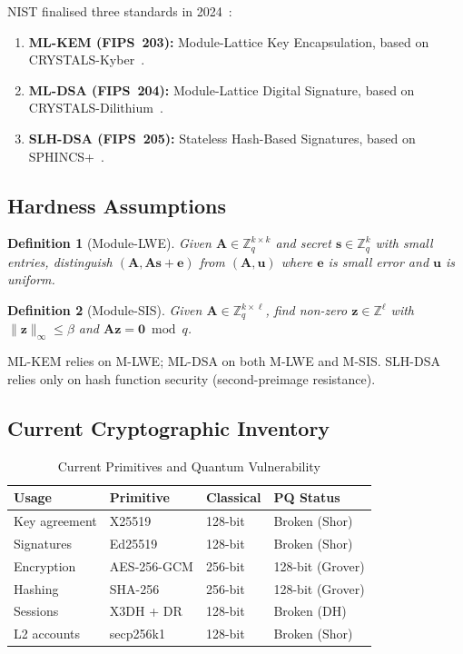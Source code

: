 \documentclass[11pt,a4paper]{article}
\newtheorem{definition}{Definition}[section]
\begin{document}
NIST finalised three standards in 2024~\cite{nist2024pqc}:

\begin{enumerate}
    \item \textbf{ML-KEM (FIPS~203):} Module-Lattice Key Encapsulation,
    based on CRYSTALS-Kyber~\cite{bos2018crystals}.
    \item \textbf{ML-DSA (FIPS~204):} Module-Lattice Digital Signature,
    based on CRYSTALS-Dilithium~\cite{ducas2018crystals}.
    \item \textbf{SLH-DSA (FIPS~205):} Stateless Hash-Based Signatures,
    based on SPHINCS+~\cite{bernstein2019sphincs}.
\end{enumerate}

\subsection{Hardness Assumptions}

\begin{definition}[Module-LWE]
    Given $\mathbf{A} \in \mathbb{Z}_q^{k \times k}$ and secret
    $\mathbf{s} \in \mathbb{Z}_q^k$ with small entries, distinguish
    $(\mathbf{A}, \mathbf{As} + \mathbf{e})$ from
    $(\mathbf{A}, \mathbf{u})$ where $\mathbf{e}$ is small error and
    $\mathbf{u}$ is uniform.
\end{definition}

\begin{definition}[Module-SIS]
    Given $\mathbf{A} \in \mathbb{Z}_q^{k \times \ell}$, find non-zero
    $\mathbf{z} \in \mathbb{Z}^{\ell}$ with
    $\|\mathbf{z}\|_\infty \leq \beta$ and
    $\mathbf{Az} = \mathbf{0} \bmod q$.
\end{definition}

ML-KEM relies on M-LWE; ML-DSA on both M-LWE and M-SIS.  SLH-DSA relies
only on hash function security (second-preimage resistance).

\subsection{Current Cryptographic Inventory}

\begin{table}[h]
\centering
\caption{Current Primitives and Quantum Vulnerability}
\label{tab:inventory}
\begin{tabular}{@{}llll@{}}
\toprule
\textbf{Usage} & \textbf{Primitive} & \textbf{Classical} & \textbf{PQ Status} \\
\midrule
Key agreement  & X25519      & 128-bit & Broken (Shor) \\
Signatures     & Ed25519     & 128-bit & Broken (Shor) \\
Encryption     & AES-256-GCM & 256-bit & 128-bit (Grover) \\
Hashing        & SHA-256     & 256-bit & 128-bit (Grover) \\
Sessions       & X3DH + DR   & 128-bit & Broken (DH) \\
L2 accounts    & secp256k1   & 128-bit & Broken (Shor) \\
\bottomrule
\end{tabular}
\end{table}
\end{document}
